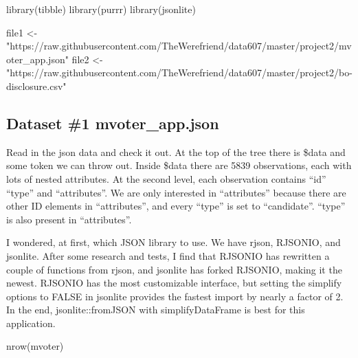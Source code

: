 \documentclass[
]{article}
\newenvironment{Shaded}{\begin{snugshade}}{\end{snugshade}}
\newcommand{\AttributeTok}[1]{\textcolor[rgb]{0.77,0.63,0.00}{#1}}
\newcommand{\ConstantTok}[1]{\textcolor[rgb]{0.00,0.00,0.00}{#1}}
\newcommand{\FunctionTok}[1]{\textcolor[rgb]{0.00,0.00,0.00}{#1}}
\newcommand{\NormalTok}[1]{#1}
\newcommand{\OtherTok}[1]{\textcolor[rgb]{0.56,0.35,0.01}{#1}}
\newcommand{\SpecialCharTok}[1]{\textcolor[rgb]{0.00,0.00,0.00}{#1}}
\newcommand{\StringTok}[1]{\textcolor[rgb]{0.31,0.60,0.02}{#1}}
\begin{document}
\begin{Shaded}
\begin{Highlighting}[]
\FunctionTok{library}\NormalTok{(tibble)}
\FunctionTok{library}\NormalTok{(purrr)}
\FunctionTok{library}\NormalTok{(jsonlite)}

\NormalTok{file1 }\OtherTok{\textless{}{-}} \StringTok{"https://raw.githubusercontent.com/TheWerefriend/data607/master/project2/mvoter\_app.json"}
\NormalTok{file2 }\OtherTok{\textless{}{-}} \StringTok{"https://raw.githubusercontent.com/TheWerefriend/data607/master/project2/bo{-}disclosure.csv"}
\end{Highlighting}
\end{Shaded}

\hypertarget{dataset-1-mvoter_app.json}{%
\subsection{Dataset \#1
mvoter\_app.json}\label{dataset-1-mvoter_app.json}}

Read in the json data and check it out. At the top of the tree there is
\$data and some token we can throw out. Inside \$data there are 5839
observations, each with lots of nested attributes. At the second level,
each observation contains ``id'' ``type'' and ``attributes''. We are
only interested in ``attributes'' because there are other ID elements in
``attributes'', and every ``type'' is set to ``candidate''. ``type'' is
also present in ``attributes''.

\begin{Shaded}
\end{Shaded}

I wondered, at first, which JSON library to use. We have rjson, RJSONIO,
and jsonlite. After some research and tests, I find that RJSONIO has
rewritten a couple of functions from rjson, and jsonlite has forked
RJSONIO, making it the newest. RJSONIO has the most customizable
interface, but setting the simplify options to FALSE in jsonlite
provides the fastest import by nearly a factor of 2. In the end,
jsonlite::fromJSON with simplifyDataFrame is best for this application.

\begin{Shaded}
\begin{Highlighting}[]
\FunctionTok{nrow}\NormalTok{(mvoter)}
\end{Highlighting}
\end{Shaded}
\end{document}
